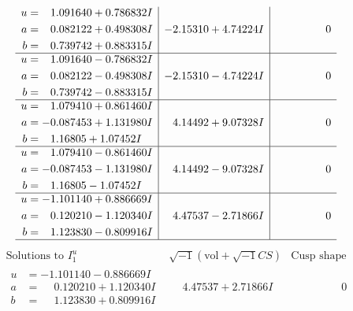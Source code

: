 \documentclass[1p]{elsarticle_modified}
\theoremstyle{definition}
\newcommand{\I}{\sqrt{-1}}
\begin{document}
$$\begin{array}{c|c|c}
\begin{aligned}
u &= \phantom{-}1.091640 + 0.786832 I \\
a &= \phantom{-}0.082122 + 0.498308 I \\
b &= \phantom{-}0.739742 + 0.883315 I\end{aligned}
 & -2.15310 + 4.74224 I & \phantom{-0.000000 } 0 \\ \hline\begin{aligned}
u &= \phantom{-}1.091640 - 0.786832 I \\
a &= \phantom{-}0.082122 - 0.498308 I \\
b &= \phantom{-}0.739742 - 0.883315 I\end{aligned}
 & -2.15310 - 4.74224 I & \phantom{-0.000000 } 0 \\ \hline\begin{aligned}
u &= \phantom{-}1.079410 + 0.861460 I \\
a &= -0.087453 + 1.131980 I \\
b &= \phantom{-}1.16805 + 1.07452 I\end{aligned}
 & \phantom{-}4.14492 + 9.07328 I & \phantom{-0.000000 } 0 \\ \hline\begin{aligned}
u &= \phantom{-}1.079410 - 0.861460 I \\
a &= -0.087453 - 1.131980 I \\
b &= \phantom{-}1.16805 - 1.07452 I\end{aligned}
 & \phantom{-}4.14492 - 9.07328 I & \phantom{-0.000000 } 0 \\ \hline\begin{aligned}
u &= -1.101140 + 0.886669 I \\
a &= \phantom{-}0.120210 - 1.120340 I \\
b &= \phantom{-}1.123830 - 0.809916 I\end{aligned}
 & \phantom{-}4.47537 - 2.71866 I & \phantom{-0.000000 } 0\\
 \hline 
 \end{array}$$\newpage$$\begin{array}{c|c|c}  
\text{Solutions to }I^u_{1}& \I (\text{vol} + \sqrt{-1}CS) & \text{Cusp shape}\\
 \hline 
\begin{aligned}
u &= -1.101140 - 0.886669 I \\
a &= \phantom{-}0.120210 + 1.120340 I \\
b &= \phantom{-}1.123830 + 0.809916 I\end{aligned}
 & \phantom{-}4.47537 + 2.71866 I & \phantom{-0.000000 } 0 \\ \hline\begin{aligned}

\end{aligned}
\end{array}$$
\end{document}

